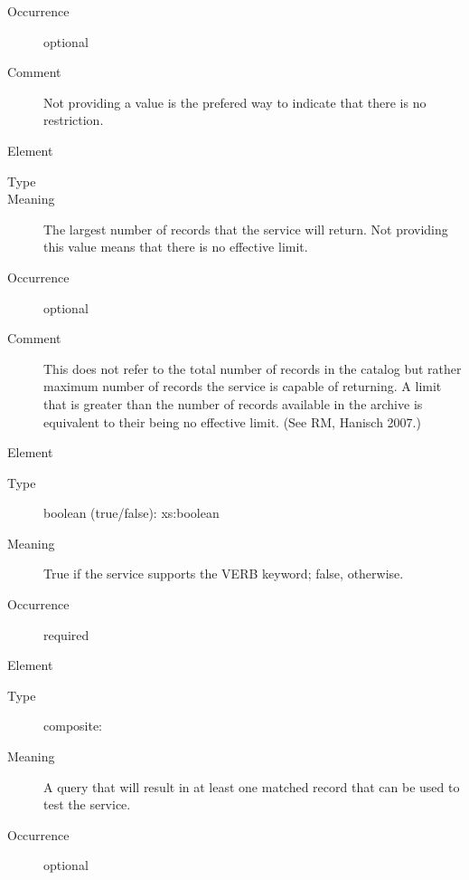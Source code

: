 \documentclass[11pt,a4paper]{ivoa}
\begin{document}
\begin{generated}
\begin{bigdescription}
\begin{description}
\item[Occurrence] optional
\item[Comment] 
                        Not providing a value is the prefered way to indicate
                        that there is no restriction. 
                     

\end{description}
\item[Element \xmlel{maxRecords}]
\begin{description}
\item[Type] 
\item[Meaning] 
                        The largest number of records that the service will 
                        return.  Not providing this value means that
                        there is no effective limit.  
                     
\item[Occurrence] optional
\item[Comment] 
                        This does not refer to the total number of records in 
                        the catalog but rather maximum number of records the 
                        service is capable of returning.  A limit that is 
                        greater than the number of records available in the 
                        archive is equivalent to their being no effective 
                        limit.  (See RM, Hanisch 2007.)
                     

\end{description}
\item[Element \xmlel{verbosity}]
\begin{description}
\item[Type] boolean (true/false): xs:boolean
\item[Meaning] 
                        True if the service supports the VERB keyword; 
                        false, otherwise.
                     
\item[Occurrence] required

\end{description}
\item[Element \xmlel{testQuery}]
\begin{description}
\item[Type] composite: 
\item[Meaning] 
                        A query that will result in at least one
                        matched record that can be used to test the
                        service.  
                     
\item[Occurrence] optional

\end{description}


\end{bigdescription}\endgroup

\endgroup
\end{generated}
\end{document}
